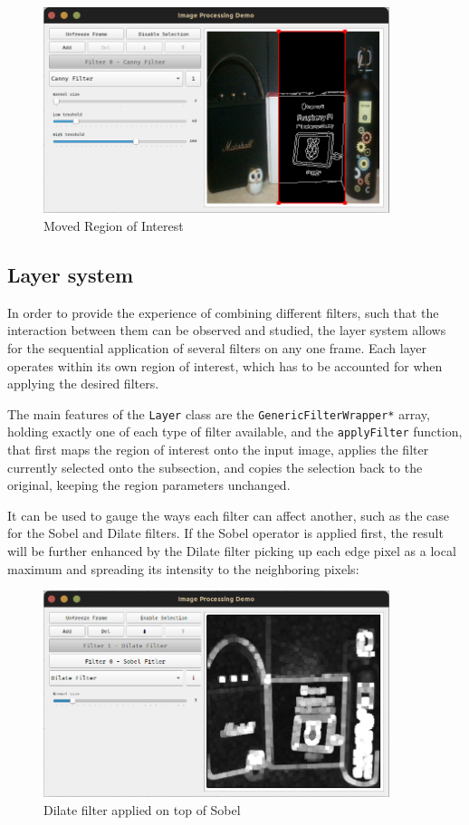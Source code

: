 \begin{figure}[H]
	\includegraphics[width=0.9\textwidth, height=0.45\textwidth]{resources/Roi_2.png}
	\caption{Moved Region of Interest}
\end{figure}

\subsection{Layer system}

In order to provide the experience of combining different filters, such that the interaction between them can
be observed and studied, the layer system allows for the sequential application of several filters on any one
frame. Each layer operates within its own region of interest, which has to be accounted for when applying the
desired filters.

The main features of the \verb|Layer| class are the \verb|GenericFilterWrapper*| array, holding exactly one
of each type of filter available, and the \verb|applyFilter| function, that first maps the region of interest
onto the input image, applies the filter currently selected onto the subsection, and copies the selection back
to the original, keeping the region parameters unchanged.

It can be used to gauge the ways each filter can affect another, such as the case for the Sobel and Dilate
filters. If the Sobel operator is applied first, the result will be further enhanced by the Dilate filter
picking up each edge pixel as a local maximum and spreading its intensity to the neighboring pixels:

\begin{figure}[H]
	\includegraphics[width=0.9\textwidth, height=0.45\textwidth]{resources/Layers_1.png}
	\caption{Dilate filter applied on top of Sobel}
\end{figure}

